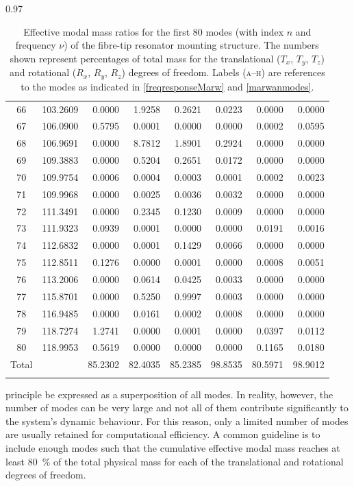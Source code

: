 \documentclass[../Thesis-IJspeert.tex]{subfiles}
\begin{document}
\begin{spacing}{0.97}
\begin{small}
\begin{longtable}{crrrrrrr}
			66 & 103.2609 & 0.0000 & 1.9258 & 0.2621 & 0.0223 & 0.0000 & 0.0000 \\  
			67 & 106.0900 & 0.5795 & 0.0001 & 0.0000 & 0.0000 & 0.0002 & 0.0595 \\  
			68 & 106.9691 & 0.0000 & 8.7812 & 1.8901 & 0.2924 & 0.0000 & 0.0000 \\  
			69 & 109.3883 & 0.0000 & 0.5204 & 0.2651 & 0.0172 & 0.0000 & 0.0000 \\  
			70 & 109.9754 & 0.0006 & 0.0004 & 0.0003 & 0.0001 & 0.0002 & 0.0023 \\  
			71 & 109.9968 & 0.0000 & 0.0025 & 0.0036 & 0.0032 & 0.0000 & 0.0000 \\  
			72 & 111.3491 & 0.0000 & 0.2345 & 0.1230 & 0.0009 & 0.0000 & 0.0000 \\  
			73 & 111.9323 & 0.0939 & 0.0001 & 0.0000 & 0.0000 & 0.0191 & 0.0016 \\  
			74 & 112.6832 & 0.0000 & 0.0001 & 0.1429 & 0.0066 & 0.0000 & 0.0000 \\  
			75 & 112.8511 & 0.1276 & 0.0000 & 0.0001 & 0.0000 & 0.0008 & 0.0051 \\  
			76 & 113.2006 & 0.0000 & 0.0614 & 0.0425 & 0.0033 & 0.0000 & 0.0000 \\  
			77 & 115.8701 & 0.0000 & 0.5250 & 0.9997 & 0.0003 & 0.0000 & 0.0000 \\  
			78 & 116.9485 & 0.0000 & 0.0161 & 0.0002 & 0.0008 & 0.0000 & 0.0000 \\  
			79 & 118.7274 & 1.2741 & 0.0000 & 0.0001 & 0.0000 & 0.0397 & 0.0112 \\  
			80 & 118.9953 & 0.5619 & 0.0000 & 0.0000 & 0.0000 & 0.1165 & 0.0180 \\ 
			\midrule
			{Total} & {} & 85.2302 & 82.4035 & 85.2385 & 98.8535 & 80.5971 & 98.9012 \\
			\bottomrule
			\caption[Effective modal mass ratios for the fibre-tip resonator mounting structure]{Effective modal mass ratios for the first \num{80} modes (with index $n$ and frequency $\nu$) of the fibre-tip resonator mounting structure. The numbers shown represent percentages of total mass for the translational (${T}_x$, ${T}_y$, ${T}_z$) and rotational (${R}_x$, ${R}_y$, ${R}_z$) degrees of freedom. Labels (\textsc{a--h}) are references to the modes as indicated in \autoref{freqresponseMarw} and \autoref{marwanmodes}.}
			\label{modeparticipationM}
		\end{longtable}
	\end{small}
\end{spacing}
principle be expressed as a superposition of all modes. In reality, however, the number of modes can be very large and not all of them contribute significantly to the system's dynamic behaviour. For this reason, only a limited number of modes are usually retained for computational efficiency. A common guideline is to include enough modes such that the cumulative effective modal mass reaches at least \SI{80}{\percent} of the total physical mass for each of the translational and rotational degrees of freedom.
\end{document}

